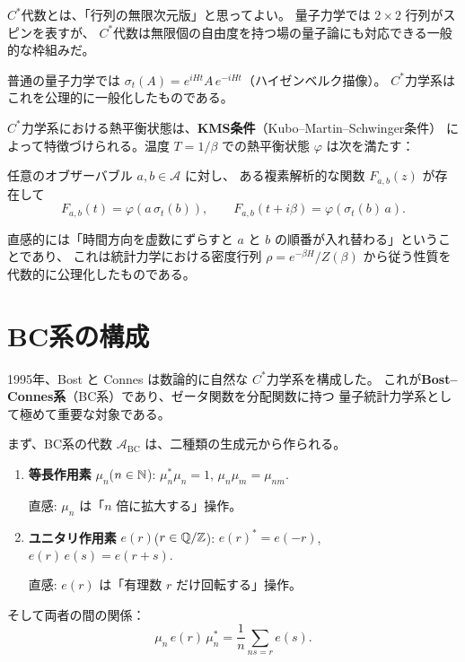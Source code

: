 \begin{hsbox}
$C^*$代数とは、「行列の無限次元版」と思ってよい。
量子力学では $2\times 2$ 行列がスピンを表すが、
$C^*$代数は無限個の自由度を持つ場の量子論にも対応できる一般的な枠組みだ。

普通の量子力学では $\sigma_t(A) = e^{iHt} A \, e^{-iHt}$（ハイゼンベルク描像）。
$C^*$力学系はこれを公理的に一般化したものである。
\end{hsbox}

$C^*$力学系における熱平衡状態は、\textbf{KMS条件}（Kubo--Martin--Schwinger条件）
によって特徴づけられる。温度 $T = 1/\beta$ での熱平衡状態 $\varphi$ は次を満たす：

任意のオブザーバブル $a, b \in \mathcal{A}$ に対し、
ある複素解析的な関数 $F_{a,b}(z)$ が存在して
\[
  F_{a,b}(t) = \varphi(a\,\sigma_t(b)), \qquad
  F_{a,b}(t + i\beta) = \varphi(\sigma_t(b)\, a).
\]

直感的には「時間方向を虚数にずらすと $a$ と $b$ の順番が入れ替わる」ということであり、
これは統計力学における密度行列 $\rho = e^{-\beta H}/Z(\beta)$ から従う性質を
代数的に公理化したものである。

\section{BC系の構成}
\label{sec:2.2}

1995年、Bost と Connes は数論的に自然な $C^*$力学系を構成した。
これが\textbf{Bost--Connes系}（BC系）であり、ゼータ関数を分配関数に持つ
量子統計力学系として極めて重要な対象である。

まず、BC系の代数 $\mathcal{A}_{\mathrm{BC}}$ は、二種類の生成元から作られる。

\begin{dfnbox}[BC系の生成元]
\begin{enumerate}
  \item \textbf{等長作用素} $\mu_n$\;($n\in\mathbb{N}$): $\mu_n^* \mu_n = 1$,\;
        $\mu_n \mu_m = \mu_{nm}$.

        直感: $\mu_n$ は「$n$ 倍に拡大する」操作。
  \item \textbf{ユニタリ作用素} $e(r)$\;($r\in\mathbb{Q}/\mathbb{Z}$): $e(r)^* = e(-r)$,\;
        $e(r)\,e(s) = e(r+s)$.

        直感: $e(r)$ は「有理数 $r$ だけ回転する」操作。
\end{enumerate}
そして両者の間の関係：
\[
  \mu_n \, e(r) \, \mu_n^* = \frac{1}{n}\sum_{ns=r} e(s).
\]
\end{dfnbox}

